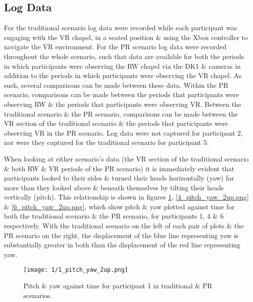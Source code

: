
\subsection{Log Data}

For the traditional scenario log data were recorded while each participant was engaging with the VR chapel, in a seated position \& using the Xbox controller to navigate the VR environment. For the PR scenario log data were recorded throughout the whole scenario, such that data are available for both the periods in which participants were observing the RW chapel via the DK1 \& cameras in addition to the periods in which participants were observing the VR chapel. As such, several comparisons can be made between these data. Within the PR scenario, comparisons can be made between the periods that participants were observing RW \& the periods that participants were observing VR. Between the traditional scenario \& the PR scenario, comparisons can be made between the VR section of the traditional scenario \& the periods that participants were observing VR in the PR scenario. Log data were not captured for participant 2, nor were they captured for the traditional scenario for participant 5.

When looking at either scenario's data (the VR section of the traditional scenario \& both RW \& VR periods of the PR scenario) it is immediately evident that participants looked to their sides \& turned their heads horizontally (yaw) far more than they looked above \& beneath themselves by tilting their heads vertically (pitch). This relationship is shown in figures \ref{1_pitch_yaw_2up.png}, \ref{4_pitch_yaw_2up.png} \& \ref{6_pitch_yaw_2up.png}, which show pitch \& yaw plotted against time for both the traditional scenario \& the PR scenario, for participants 1, 4 \& 6 respectively. With the traditional scenario on the left of each pair of plots \& the PR scenario on the right, the displacement of the blue line representing yaw is substantially greater in both than the displacement of the red line representing yaw.

\begin{figure}
	\begin{center}
	\texttt{[image: 1/1\_pitch\_yaw\_2up.png]}
	\caption{Pitch \& yaw against time for participant 1 in traditional \& PR scenarios.}
	\label{1_pitch_yaw_2up.png}
	\end{center}
\end{figure}

